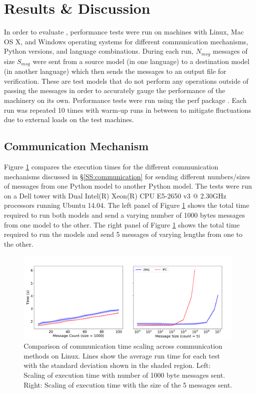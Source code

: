 \documentclass[journal]{IEEEtran}
\newcommand{\todo}[1]{{\color{red}{#1}}}
\newcommand{\pkg}{{\tt \todo{cis\_interface}}{}}
\begin{document}
\section{Results \& Discussion}\label{S:results}
%
In order to evaluate {\pkg}, performance tests were run on machines with Linux, Mac OS X, and Windows operating systems for different communication mechanisms, Python versions, and language combinations. During each run, $N_{msg}$ messages of size $S_{msg}$ were sent from a source model (in one language) to a destination model (in another language) which then sends the messages to an output file for verification. These are test models that do not perform any operations outside of passing the messages in order to accurately gauge the performance of the {\pkg} machinery on its own. Performance tests were run using the perf package \citep{Stinner2018}. Each run was repeated 10 times with warm-up runs in between to mitigate fluctuations due to external loads on the test machines.

\subsection{Communication Mechanism}\label{SS:results_commtype}
%
Figure \ref{fig:commtype} compares the execution times for the different communication mechanisms discussed in \S\ref{SS:communication} for sending different numbers/sizes of messages from one Python model to another Python model. The tests were run on a Dell tower with Dual Intel(R) Xeon(R) CPU E5-2650 v3 @ 2.30GHz processors running Ubuntu 14.04. The left panel of Figure \ref{fig:commtype} shows the total time required to run both models and send a varying number of 1000 bytes messages from one model to the other. The right panel of Figure \ref{fig:commtype} shows the total time required to run the models and send 5 messages of varying lengths from one to the other. 
%
\ifinclfig
 	\begin{figure}[htbp]
	\begin{center}
	\includegraphics[width=\columnwidth,keepaspectratio]{./images/scaling_commtype.png}
	\caption{Comparison of communication time scaling across communication methods on Linux. Lines show the average run time for each test with the standard deviation shown in the shaded region. Left: Scaling of execution time with number of 1000 byte messages sent. Right: Scaling of execution time with the size of the 5 messages sent.}
	\label{fig:commtype}
	\end{center}
	\end{figure}
\fi
%
\end{document}
